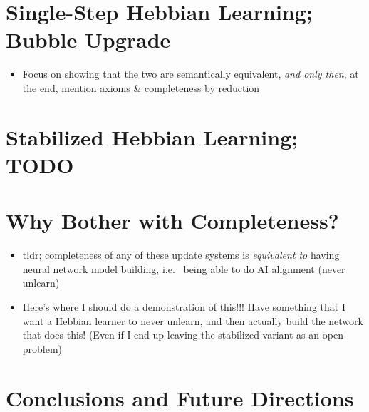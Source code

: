 \documentclass[letterpaper]{article}
\theoremstyle{definition}
\begin{document}
\section{Single-Step Hebbian Learning; Bubble Upgrade}

\begin{itemize}
    \item Focus on showing that the two are semantically equivalent, \textit{and only then}, at the end, mention axioms \& completeness by reduction
\end{itemize}

\section{Stabilized Hebbian Learning; TODO}

\section{Why Bother with Completeness?}

\begin{itemize}
    \item tldr; completeness of any of these update systems is \emph{equivalent to} having neural network model building, i.e.~ being able to do AI alignment (never unlearn)

    \item Here's where I should do a demonstration of this!!!  Have something that I want a Hebbian learner to never unlearn, and then actually build the network that does this!  (Even if I end up leaving the stabilized variant as an open problem)
\end{itemize}

\section{Conclusions and Future Directions}






\end{document}
